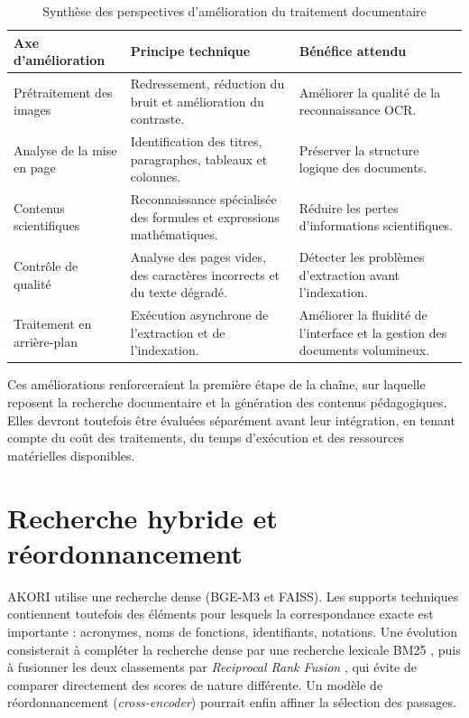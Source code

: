 \documentclass[12pt,a4paper,oneside]{report}
\renewcommand{\arraystretch}{1.2}
\begin{document}
\begin{table}[H]
  \centering
  \caption{Synthèse des perspectives d'amélioration du traitement documentaire}
  \label{tab:amelioration-documentaire}
  \renewcommand{\arraystretch}{1.4}
  \begin{tabularx}{\textwidth}{|p{3.2cm}|X|X|}
    \hline
    \textbf{Axe d'amélioration} & \textbf{Principe technique} & \textbf{Bénéfice attendu} \\ \hline
    Prétraitement des images & Redressement, réduction du bruit et amélioration du contraste. & Améliorer la qualité de la reconnaissance OCR. \\ \hline
    Analyse de la mise en page & Identification des titres, paragraphes, tableaux et colonnes. & Préserver la structure logique des documents. \\ \hline
    Contenus scientifiques & Reconnaissance spécialisée des formules et expressions mathématiques. & Réduire les pertes d'informations scientifiques. \\ \hline
    Contrôle de qualité & Analyse des pages vides, des caractères incorrects et du texte dégradé. & Détecter les problèmes d'extraction avant l'indexation. \\ \hline
    Traitement en arrière-plan & Exécution asynchrone de l'extraction et de l'indexation. & Améliorer la fluidité de l'interface et la gestion des documents volumineux. \\ \hline
  \end{tabularx}
\end{table}

Ces améliorations renforceraient la première étape de la chaîne, sur laquelle reposent la recherche documentaire et la génération des contenus pédagogiques. Elles devront toutefois être évaluées séparément avant leur intégration, en tenant compte du coût des traitements, du temps d'exécution et des ressources matérielles disponibles.

\section{Recherche hybride et réordonnancement}

AKORI utilise une recherche dense (BGE-M3 et FAISS). Les supports techniques contiennent toutefois des éléments pour lesquels la correspondance exacte est importante : acronymes, noms de fonctions, identifiants, notations. Une évolution consisterait à compléter la recherche dense par une recherche lexicale BM25 \cite{robertson2009bm25}, puis à fusionner les deux classements par \emph{Reciprocal Rank Fusion} \cite{cormack2009rrf}, qui évite de comparer directement des scores de nature différente. Un modèle de réordonnancement (\emph{cross-encoder}) pourrait enfin affiner la sélection des passages.
\end{document}
